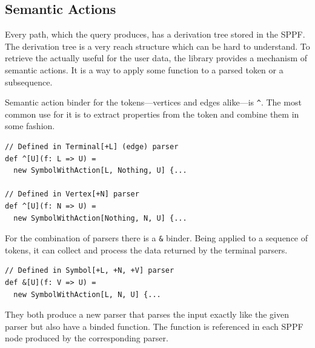 \subsection{Semantic Actions}
\label{sec:semanticActions}

Every path, which the query produces, has a derivation tree stored in the SPPF. 
The derivation tree is a very reach structure which can be hard to understand. 
To retrieve the actually useful for the user data, the library provides a mechanism of semantic actions. 
It is a way to apply some function to a parsed token or a subsequence. 


Semantic action binder for the tokens---vertices and edges alike---is \lstinline{^}. The most common use for it is to extract properties from the token and combine them in some fashion. 

\begin{lstlisting}
// Defined in Terminal[+L] (edge) parser
def ^[U](f: L => U) = 
  new SymbolWithAction[L, Nothing, U] {...
  
// Defined in Vertex[+N] parser
def ^[U](f: N => U) = 
  new SymbolWithAction[Nothing, N, U] {...
\end{lstlisting}

For the combination of parsers there is a \lstinline{&} binder. Being  applied to a sequence of tokens, it can collect and process the data returned by the terminal parsers.
\begin{lstlisting}
// Defined in Symbol[+L, +N, +V] parser
def &[U](f: V => U) = 
  new SymbolWithAction[L, N, U] {...
\end{lstlisting}

They both produce a new parser that parses the input exactly like the given parser but also have a binded function.
The function is referenced in each SPPF node produced by the corresponding parser.

